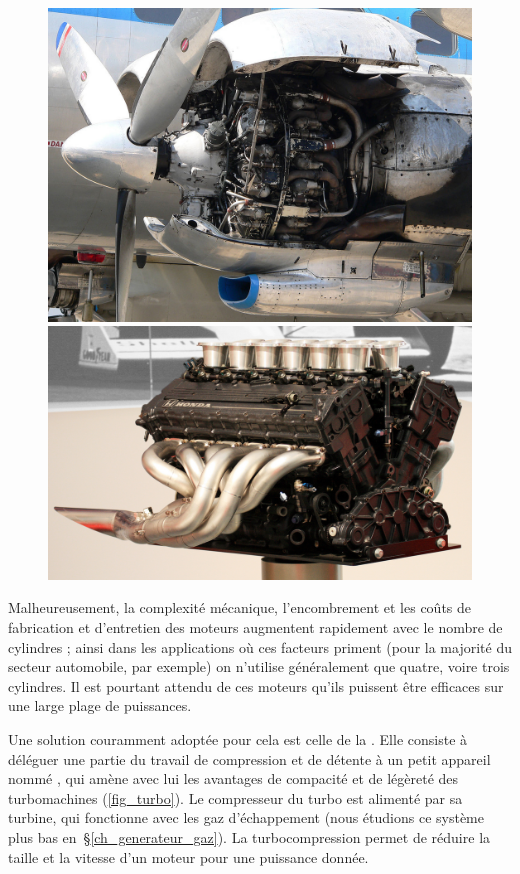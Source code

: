 		\begin{figure}
			\begin{center}
				\includegraphics[height=0.325\textwidth]{images/curtiss_wright_cyclone.jpg}
				\includegraphics[height=0.325\textwidth]{images/honda_v12.jpg}
			\end{center}
			\label{fig_beaucoup_cylindres}
		\end{figure}
		
		Malheureusement, la complexité mécanique, l’encombrement et les coûts de fabrication et d’entretien des moteurs augmentent rapidement avec le nombre de cylindres ; ainsi dans les applications où ces facteurs priment (pour la majorité du secteur automobile, par exemple) on n’utilise généralement que quatre, voire trois cylindres. Il est pourtant attendu de ces moteurs qu’ils puissent être efficaces sur une large plage de puissances.
	
		Une solution couramment adoptée pour cela est celle de la . Elle consiste à déléguer une partie du travail de compression et de détente à un petit appareil nommé , qui amène avec lui les avantages de compacité et de légèreté des turbomachines (\cref{fig_turbo}). Le compresseur du turbo est alimenté par sa turbine, qui fonctionne avec les gaz d’échappement (nous étudions ce système plus bas en~\S\ref{ch_generateur_gaz}). La turbocompression permet de réduire la taille et la vitesse d’un moteur pour une puissance donnée.
		
